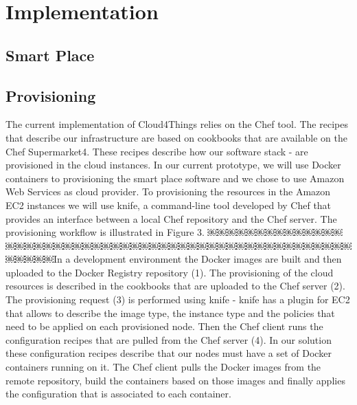 
\chapter{Implementation}
\label{chapter:implementation}

\section{Smart Place}
\label{sec:Smart Place}


\section{Provisioning}
\label{sec:provisioning}
The current implementation of Cloud4Things relies on the Chef tool. The recipes that describe our
infrastructure are based on cookbooks that are available on the Chef Supermarket4. These recipes
describe how our software stack - are provisioned in the cloud instances. In our current prototype,
we will use Docker containers to provisioning the smart place software and we chose to use Amazon Web
Services as cloud provider. To provisioning the resources in the Amazon EC2 instances we will use knife,
a command-line tool developed by Chef that provides an interface between a local Chef repository and
the Chef server. The provisioning workflow is illustrated in Figure 3. ￼￼￼￼￼￼￼￼￼￼￼￼￼￼￼￼￼￼￼￼￼￼￼￼￼￼￼￼￼￼￼￼￼￼￼￼￼￼￼￼￼￼￼￼￼￼￼￼￼￼￼￼￼￼￼In a development environment
the Docker images are built and then uploaded to the Docker Registry repository (1). The provisioning
of the cloud resources is described in the cookbooks that are uploaded to the Chef server (2). The
provisioning request (3) is performed using knife - knife has a plugin for EC2 that allows to describe
the image type, the instance type and the policies that need to be applied on each provisioned node.
Then the Chef client runs the configuration recipes that are pulled from the Chef server (4). In our
solution these configuration recipes describe that our nodes must have a set of Docker containers
running on it. The Chef client pulls the Docker images from the remote repository, build the containers
based on those images and finally applies the configuration that is associated to each container.
